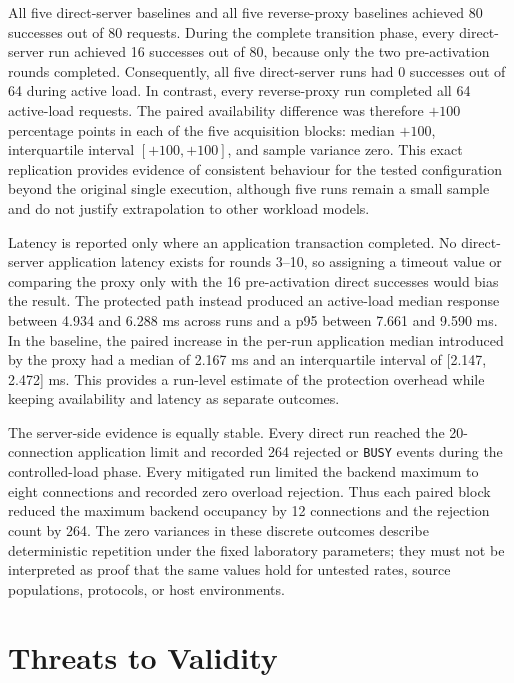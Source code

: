 All five direct-server baselines and all five reverse-proxy baselines achieved
80 successes out of 80 requests. During the complete transition phase, every
direct-server run achieved 16 successes out of 80, because only the two
pre-activation rounds completed. Consequently, all five direct-server runs had
0 successes out of 64 during active load. In contrast, every reverse-proxy run
completed all 64 active-load requests. The paired availability difference was
therefore $+100$ percentage points in each of the five acquisition blocks:
median $+100$, interquartile interval $[+100,+100]$, and sample variance zero.
This exact replication provides evidence of consistent behaviour for the
tested configuration beyond the original single execution, although five runs
remain a small sample and do not justify extrapolation to other workload
models.

Latency is reported only where an application transaction completed. No
direct-server application latency exists for rounds 3--10, so assigning a
timeout value or comparing the proxy only with the 16 pre-activation direct
successes would bias the result. The protected path instead produced an
active-load median response between 4.934 and 6.288 ms across runs and a p95
between 7.661 and 9.590 ms. In the baseline, the paired increase in the
per-run application median introduced by the proxy had a median of 2.167 ms
and an interquartile interval of [2.147, 2.472] ms. This provides a run-level
estimate of the protection overhead while keeping availability and latency as
separate outcomes.

The server-side evidence is equally stable. Every direct run reached the
20-connection application limit and recorded 264 rejected or \texttt{BUSY}
events during the controlled-load phase. Every mitigated run limited the
backend maximum to eight connections and recorded zero overload rejection.
Thus each paired block reduced the maximum backend occupancy by 12 connections
and the rejection count by 264. The zero variances in these discrete outcomes
describe deterministic repetition under the fixed laboratory parameters; they
must not be interpreted as proof that the same values hold for untested rates,
source populations, protocols, or host environments.

\section{Threats to Validity}
\label{sec:experimental-threats-validity}

